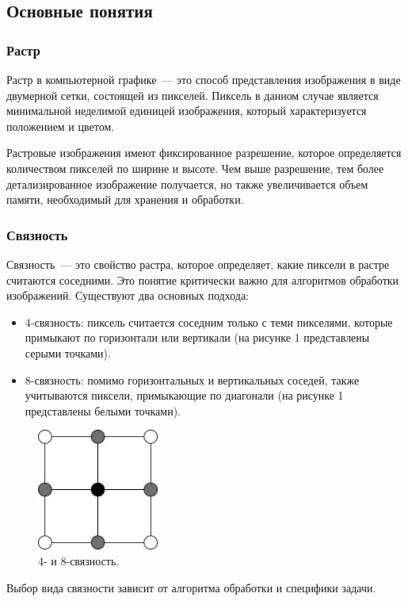 
\subsection{Основные понятия}
\subsubsection*{Растр}
Растр в компьютерной графике~--- это способ представления изображения в виде двумерной сетки, состоящей из пикселей. Пиксель в данном случае является минимальной неделимой единицей изображения, который характеризуется положением и цветом.

Растровые изображения имеют фиксированное разрешение, которое определяется количеством пикселей по ширине и высоте. Чем выше разрешение, тем более детализированное изображение получается, но также увеличивается объем памяти, необходимый для хранения и обработки.
\subsubsection*{Связность}
Связность~--- это свойство растра, которое определяет, какие пиксели в растре считаются соседними. Это понятие критически важно для алгоритмов обработки изображений. Существуют два основных подхода:
\begin{itemize}
    \item 4-связность: пиксель считается соседним только с теми пикселями, которые примыкают по горизонтали или вертикали (на рисунке 1 представлены серыми точками).
    \item 8-связность: помимо горизонтальных и вертикальных соседей, также учитываются пиксели, примыкающие по диагонали (на рисунке 1 представлены белыми точками).
\end{itemize}

\begin{figure}[H]
    \centering
    \includegraphics[width = 4cm]{cohesion.jpg}
    \caption{4- и 8-связность.}
    \label{fig:float}
\end{figure}
Выбор вида связности зависит от алгоритма обработки и специфики задачи.

